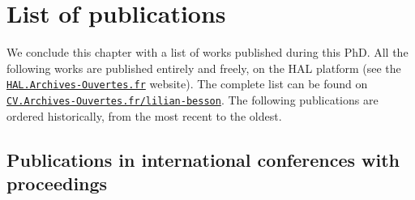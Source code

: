 

\section{List of publications}
\label{sec:1:listPublications}

We conclude this chapter with a list of works published during this PhD.
All the following works are published entirely and freely, on the HAL platform (see the \href{https://hal.archives-ouvertes.fr/}{\texttt{HAL.Archives-Ouvertes.fr}} website).
The complete list can be found on
\href{https://cv.archives-ouvertes.fr/lilian-besson/}{\texttt{CV.Archives-Ouvertes.fr/lilian-besson}}.
%
The following publications are ordered historically, from the most recent to the oldest.


\subsection*{Publications in international conferences with proceedings}

